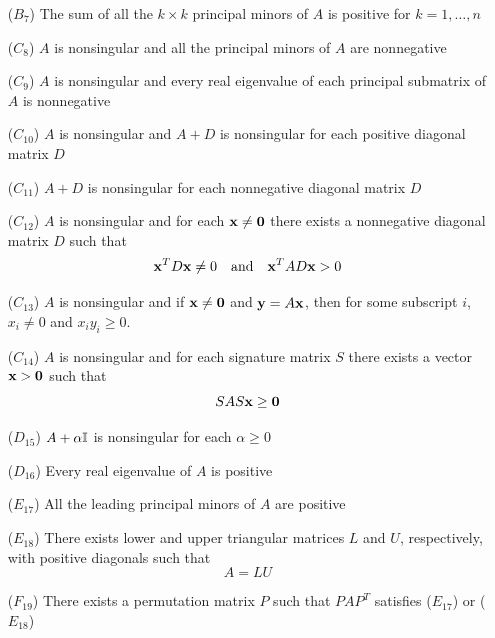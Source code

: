 \documentclass[aspectratio=169]{beamer}
\begin{document}
\begin{frame}
\addtocounter{theorem}{-1}
\begin{theorem}[Continued]
\begin{enumerate}
\item[($B_7$)] The sum of all the $k\times k$ principal minors of $A$ is positive for $k=1,\ldots,n$
\item[($C_8$)] $A$ is nonsingular and all the principal minors of $A$ are nonnegative
\item[($C_9$)] $A$ is nonsingular and every real eigenvalue of each principal submatrix of $A$ is nonnegative
\item[($C_{10}$)] $A$ is nonsingular and $A+D$ is nonsingular for each positive diagonal matrix $D$
\item[($C_{11}$)] $A+D$ is nonsingular for each nonnegative diagonal matrix $D$
\item[($C_{12}$)] $A$ is nonsingular and for each $\bx\neq\b0$ there exists a nonnegative diagonal matrix $D$ such that
\[
\mathbf{x}^TD\mathbf{x}\neq 0\quad\textrm{and}\quad \mathbf{x}^TAD\mathbf{x}>0
\]
\item[($C_{13}$)] $A$ is nonsingular and if $\bx\neq\b0$ and $\mathbf{y}=A\mathbf{x}$, then for some subscript $i$, $x_i\neq 0$ and $x_iy_i\geq 0$.
\item[($C_{14}$)] $A$ is nonsingular and for each signature matrix $S$ there exists a vector $\bx>\b0$ such that
\[
SAS\bx\geq\b0
\]
\end{enumerate}
\end{theorem}
\end{frame}

\begin{frame}
\addtocounter{theorem}{-1}
\begin{theorem}[Continued]
\begin{enumerate}
\item[($D_{15}$)] $A+\alpha\mathbb{I}$ is nonsingular for each $\alpha\geq 0$
\item[($D_{16}$)] Every real eigenvalue of $A$ is positive
\item[($E_{17}$)] All the leading principal minors of $A$ are positive
\item[($E_{18}$)] There exists lower and upper triangular matrices $L$ and $U$, respectively, with positive diagonals such that
\[
A=LU
\]
\item[($F_{19}$)] There exists a permutation matrix $P$ such that $PAP^T$ satisfies ($E_{17}$) or ($E_{18}$)
\end{enumerate}
\end{theorem}
\end{frame}
\end{document}
